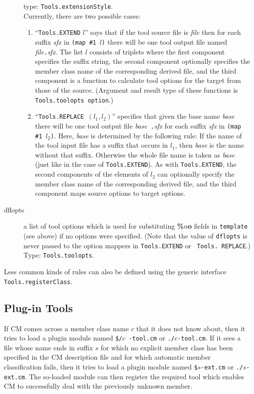 \documentclass[titlepage,letterpaper]{article}
\begin{document}
\begin{description}
type: {\tt Tools.extensionStyle}. \\
Currently, there are two possible cases:
\begin{enumerate}
\item ``{\tt Tools.EXTEND} $l$'' says that if the tool source file is
{\it file} then for each suffix {\it sfx} in {\tt (map \#1 $l$)} there
will be one tool output file named {\it file}{\tt .}{\it sfx}.  The
list $l$ consists of triplets where the first component specifies the
suffix string, the second component optionally specifies the
member class name of the corresponding derived file, and the
third component is a function to calculate tool options for the 
target from those of the source. (Argument and result type of these
functions is {\tt Tools.toolopts option}.)
\item ``{\tt Tools.REPLACE }$(l_1, l_2)$'' specifies that given the
base name {\it base} there will be one tool output file {\it base}{\tt
.}{\it sfx} for each suffix {\it sfx} in {\tt (map \#1 $l_2$)}.  Here,
{\it base} is determined by the following rule: If the name of the
tool input file has a suffix that occurs in $l_1$, then {\it base} is
the name without that suffix.  Otherwise the whole file name is taken
as {\it base} (just like in the case of {\tt Tools.EXTEND}).  As with
{\tt Tools.EXTEND}, the second components of the elements of $l_2$ can
optionally specify the member class name of the corresponding derived
file, and the third component maps source options to target options.
\end{enumerate}
\item[dflopts] a list of tool options which is used for
substituting {\bf \%$n$o} fields in {\tt template} (see above) if no
options were specified.  (Note that the value of {\tt dflopts} is never
passed to the option mappers in {\tt Tools.EXTEND} or {\tt
Tools. REPLACE}.)  Type: {\tt Tools.toolopts}.
\end{description}

Less common kinds of rules can also be defined using the generic
interface {\tt Tools.registerClass}.

\subsection{Plug-in Tools}

If CM comes across a member class name $c$ that it does not know
about, then it tries to load a plugin module named {\tt \$/}$c${\tt
-tool.cm} or {\tt ./}$c${\tt -tool.cm}.  If it sees a file whose name
ends in suffix $s$ for which no explicit member class has been
specified in the CM description file and for which automatic
member classification fails, then it tries to load a plugin module
named {\tt \$}$s${\tt -ext.cm} or {\tt ./}$s${\tt -ext.cm}.  The
so-loaded module can then register the required tool which enables CM
to successfully deal with the previously unknown member.
\end{document}
